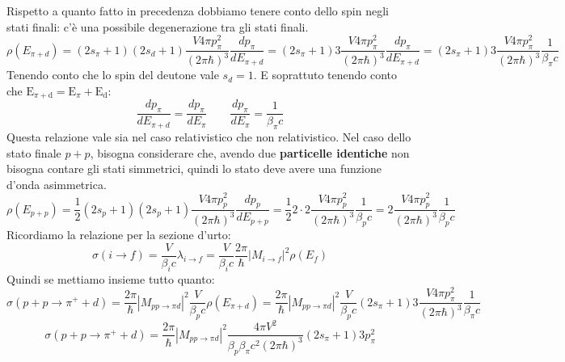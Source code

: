 Rispetto a quanto fatto in precedenza dobbiamo tenere conto dello spin negli stati finali: c'è una possibile degenerazione tra gli stati finali.
\begin{equation*}
    \rho\left(E_{\pi+d}\right)=\left(2 s_\pi+1\right)\left(2 s_d+1\right) \frac{V 4 \pi p_\pi^2}{(2 \pi \hbar)^3} \frac{d p_\pi}{d E_{\pi+d}}=\left(2 s_\pi+1\right) 3 \frac{V 4 \pi p_\pi^2}{(2 \pi \hbar)^3} \frac{d p_\pi}{d E_{\pi+d}}=\left(2 s_\pi+1\right) 3 \frac{V 4 \pi p_\pi^2}{(2 \pi \hbar)^3} \frac{1}{\beta_\pi c}
\end{equation*}
Tenendo conto che lo spin del deutone vale $s_d=1$. E soprattuto tenendo conto che $\mathrm{E}_{\pi+\mathrm{d}}=\mathrm{E}_\pi+\mathrm{E}_{\mathrm{d}}:$
\begin{equation*}
    \frac{d p_\pi}{d E_{\pi+d}}=\frac{d p_\pi}{d E_\pi} \qquad \frac{d p_\pi}{d E_\pi}=\frac{1}{\beta_\pi c}
\end{equation*}
Questa relazione vale sia nel caso relativistico che non relativistico.
Nel caso dello stato finale $p+p$, bisogna considerare che, avendo due \textbf{particelle identiche} non bisogna contare gli stati simmetrici, quindi lo stato deve avere una funzione d'onda asimmetrica.
\begin{equation*}
    \rho\left(E_{p+p}\right)=\frac{1}{2}\left(2 s_p+1\right)\left(2 s_p+1\right) \frac{V 4 \pi p_p^2}{(2 \pi \hbar)^3} \frac{d p_p}{d E_{p+p}}=\frac{1}{2} 2 \cdot 2 \frac{V 4 \pi p_p^2}{(2 \pi \hbar)^3} \frac{1}{\beta_p c}=2 \frac{V 4 \pi p_p^2}{(2 \pi \hbar)^3} \frac{1}{\beta_p c}
\end{equation*}
Ricordiamo la relazione per la sezione d'urto:
\begin{equation*}
    \sigma(i \rightarrow f)=\frac{V}{\beta_i c} \lambda_{i \rightarrow f}=\frac{V}{\beta_i c} \frac{2 \pi}{\hbar}\left|M_{i \rightarrow f}\right|^2 \rho\left(E_f\right)
\end{equation*}
Quindi se mettiamo insieme tutto quanto:
\begin{equation*}
    \sigma\left(p+p \rightarrow \pi^{+}+d\right)=\frac{2 \pi}{\hbar}\left|M_{p p \rightarrow \pi d}\right|^2 \frac{V}{\beta_p c} \rho\left(E_{\pi+d}\right)=\frac{2 \pi}{\hbar}\left|M_{p p \rightarrow \pi d}\right|^2 \frac{V}{\beta_p c}\left(2 s_\pi+1\right) 3 \frac{V 4 \pi p_\pi^2}{(2 \pi \hbar)^3} \frac{1}{\beta_\pi c}
\end{equation*}
\begin{equation*}
    \sigma\left(p+p \rightarrow \pi^{+}+d\right)=\frac{2 \pi}{\hbar}\left|M_{p p \rightarrow \pi d}\right|^2 \frac{4 \pi V^2}{\beta_p \beta_\pi c^2(2 \pi \hbar)^3}\left(2 s_\pi+1\right) 3 p_\pi^2
\end{equation*}
